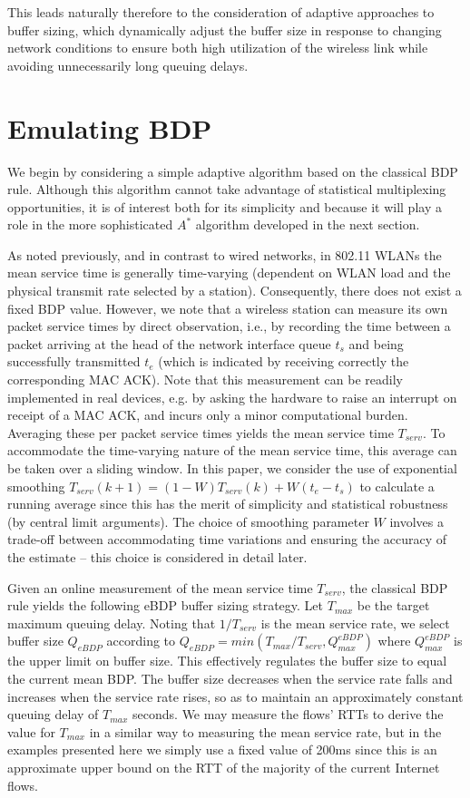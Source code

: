 \documentclass[10pt,twocolumn, journal]{IEEEtran}
\begin{document}
This leads naturally therefore to the consideration of adaptive approaches to buffer sizing, which dynamically adjust the buffer size in response to changing network conditions to ensure both high utilization of the wireless link while avoiding unnecessarily long queuing delays.

\section{Emulating BDP}\label{sec_eBDP}

We begin by considering a simple adaptive algorithm based on the classical BDP rule.   Although this algorithm cannot take advantage of statistical multiplexing opportunities, it is of interest both for its simplicity and because it will play a role in the more sophisticated $A^*$ algorithm developed in the next section.

As noted previously, and in contrast to wired networks,  in 802.11 WLANs the mean service time is generally time-varying (dependent on WLAN load and the physical transmit rate selected by a station). Consequently, there does not exist a fixed BDP value.   However, we note that a wireless station can measure its own packet service times by direct observation, i.e., by recording the time between a packet arriving at the head of the network interface queue $t_s$ and being successfully transmitted $t_e$ (which is indicated by receiving correctly the corresponding MAC ACK).  Note that this measurement can be readily implemented in real devices, e.g. by asking the hardware to raise an interrupt on receipt of a MAC ACK, and incurs only a minor computational burden.    Averaging these per packet service times yields the mean service time $T_{serv}$.   To accommodate the time-varying nature of the mean service time, this average can be taken over a sliding window.  In this paper, we consider the use of exponential smoothing $T_{serv}(k+1) = (1-W) T_{serv}(k) + W(t_e-t_s)$ to calculate a running average since this has the merit of simplicity and statistical robustness (by central limit arguments).  The choice of smoothing parameter $W$ involves a trade-off between accommodating time variations and ensuring the accuracy of the estimate -- this choice is considered in detail later.

Given an online measurement of the mean service time $T_{serv}$, the classical BDP rule yields the following eBDP buffer sizing strategy. Let $T_{max}$ be the target maximum queuing delay. Noting that $1/T_{serv}$ is the mean service rate, we select buffer size $Q_{eBDP}$ according to
$Q_{eBDP}=min(T_{max}/T_{serv},Q_{max}^{eBDP})$ where $Q_{max}^{eBDP}$ is the upper limit
on buffer size. This effectively regulates the buffer size to equal the current mean BDP.
The buffer size decreases when the service rate falls and increases when the service rate
rises, so as to maintain an approximately constant queuing delay of $T_{max}$ seconds.
We may measure the flows' RTTs to derive the value for $T_{max}$ in a similar way to measuring the mean service rate, but in the examples presented here we simply use a fixed value of 200ms since this is an approximate upper bound on the RTT of the majority of the current Internet flows.
\end{document}
